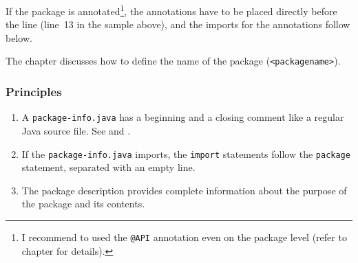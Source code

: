 If the package is annotated\footnote{I recommend to used the \lstinline|@API| annotation even on the package level (refer to chapter  for details).}, the annotations have to be placed directly before the  line (line~13 in the sample above), and the imports for the annotations follow below.

The chapter  discusses how to define the name of the package (\texttt{<packagename>}).


\subsubsection{Principles}
\begin{enumerate}[label=P\arabic*.]
	\item{A \texttt{package-info.java} has a beginning and a closing comment like a regular Java source file. See  and .}
	\item{If the \texttt{package-info.java} imports, the \lstinline|import| statements follow the \lstinline|package| statement, separated with an empty line.}
	\item{The package description provides complete information about the purpose of the package and its contents.}
\end{enumerate}

